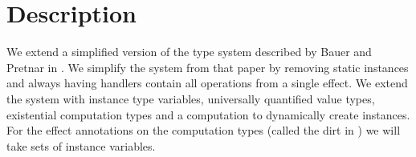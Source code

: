 \newcommand\Eff[0]{E}
\newcommand\eff[0]{\varepsilon}
\newcommand\Op[0]{O}
\newcommand\op[0]{op}
\newcommand\inst[0]{\iota}

\newcommand\pty[1]{\ty^1_{#1}}
\newcommand\rty[1]{\ty^2_{#1}}

\newcommand\ty[0]{\tau}
\newcommand\tunit[0]{()}
\newcommand\tarr[2]{#1 \rightarrow #2}
\newcommand\thandler[2]{#1 \Rightarrow #2}
\newcommand\tforall[3]{\forall(#1:#2) . #3}

\newcommand\cty[0]{\underline{\ty}}
\newcommand\aty[2]{#1 \; ! \; #2}
\newcommand\texists[3]{\exists(#1:#2) . #3}
\newcommand\texistss[2]{\exists \overrightarrow{#1} . #2}

\newcommand\val[0]{\nu}
\newcommand\vunit[0]{()}
\newcommand\vinst[1]{\mathsf{inst}(#1)}
\newcommand\vabst[3]{\Lambda(#1:#2) . #3}
\newcommand\vabs[2]{\lambda #1 . #2}
\newcommand\vappt[2]{#1 \; [ #2 ]}
\newcommand\vhandler[1]{\textit{handler} \; \{#1\}}
\newcommand\vhandleri[2]{\textit{handler} ( #1 ) \; \{#2\}}
\newcommand\vhandlerc[0]{\vhandler{
	\textit{return} \; x \rightarrow \comp,
	\op_1(x ; k) \rightarrow \comp,
	...,
	\op_n(x ; k) \rightarrow \comp
}}
\newcommand\vhandlerci[1]{\vhandleri{#1}{
	\textit{return} \; x \rightarrow \comp,
	\op_1(x ; k) \rightarrow \comp,
	...,
	\op_n(x ; k) \rightarrow \comp
}}

\newcommand\comp[0]{c}
\newcommand\creturn[1]{\textit{return} \; #1}
\newcommand\capp[2]{#1 \; #2}
\newcommand\cdo[3]{#1 \leftarrow #2 ; #3}
\newcommand\cop[4]{#1(#2 ; #3 . #4)}
\newcommand\copi[5]{#1 \# #2(#3 ; #4 . #5)}
\newcommand\chandle[2]{\textit{with} \; #1 \; \textit{handle} \; #2}
\newcommand\cnew[1]{\textit{new} \; #1}
\newcommand\cunpack[4]{(#1, #2) \leftarrow #3 ; #4}

\newcommand\subty[2]{#1 <: #2}
\newcommand\sep[0]{\;;\;}

\section{Description}
We extend a simplified version of the type system described by Bauer and Pretnar in \cite{effectsystem}.
We simplify the system from that paper by removing static instances and always having handlers contain all operations from a single effect.
We extend the system with instance type variables,  universally quantified value types, existential computation types and a computation to dynamically create instances.
For the effect annotations on the computation types (called the dirt in \cite{effectsystem}) we will take sets of instance variables. 

